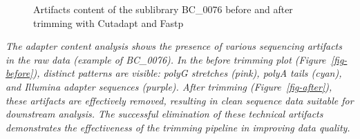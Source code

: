 \documentclass[
  11pt,
  a4paper,
]{report}
\begin{document}
\begin{figure}
\begin{minipage}{0.50\linewidth}
{}


\end{minipage}%

\caption{\label{fig-adaptateur}Artifacts content of the sublibrary
BC\_0076 before and after trimming with Cutadapt and Fastp}

\end{figure}%

\emph{The adapter content analysis shows the presence of various
sequencing artifacts in the raw data (example of BC\_0076). In the
before trimming plot (Figure~\ref{fig-before}), distinct patterns are
visible: polyG stretches (pink), polyA tails (cyan), and Illumina
adapter sequences (purple). After trimming (Figure~\ref{fig-after}),
these artifacts are effectively removed, resulting in clean sequence
data suitable for downstream analysis. The successful elimination of
these technical artifacts demonstrates the effectiveness of the trimming
pipeline in improving data quality.}
\end{document}

